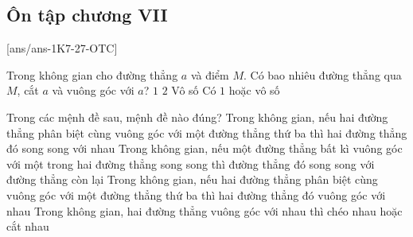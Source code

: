 \subsection{Ôn tập chương VII}
[ans/ans-1K7-27-OTC]

\begin{ex}%
	Trong không gian cho đường thẳng $a$ và điểm $ M $. Có bao nhiêu đường thẳng qua $ M $, cắt $a$ và vuông góc với $a $?
	\choice
	{$1$}
	{$2$}
	{Vô số}
	{\True Có $1$ hoặc vô số}
\end{ex}

\begin{ex}%
	Trong các mệnh đề sau, mệnh đề nào đúng?
	\choice
	{Trong không gian, nếu hai đường thẳng phân biệt cùng vuông góc với một đường thẳng thứ ba thì hai đường thẳng đó song song với nhau}
	{Trong không gian, nếu một đường thẳng bất kì vuông góc với một trong hai đường thẳng song song thì đường thẳng đó song song với đường thẳng còn lại}
	{Trong không gian, nếu hai đường thẳng phân biệt cùng vuông góc với một đường thẳng thứ ba thì hai đường thẳng đó vuông góc với nhau}
	{\True Trong không gian, hai đường thẳng vuông góc với nhau thì chéo nhau hoặc cắt nhau}
\end{ex}

